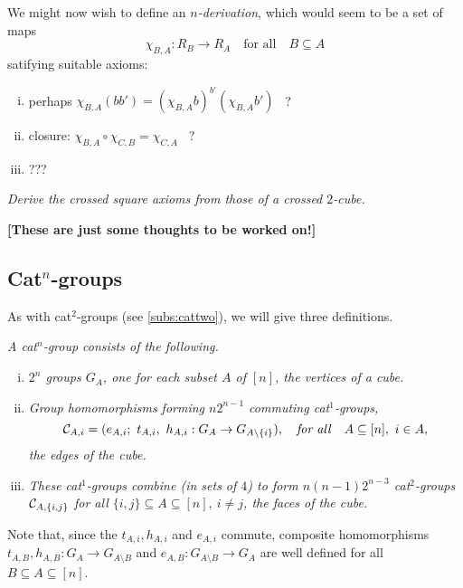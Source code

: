 \bigskip
We might now wish to define an \emph{$n$-derivation}, 
which would seem to be a set of maps
$$
\chi_{B,A} : R_B \to R_A  \quad\mbox{for all}\quad  B \subseteq A
$$
satifying suitable axioms:
\begin{enumerate}[(i)]
\item
perhaps  \qquad 
$\chi_{B,A}(bb') = (\chi_{B,A} b)^{b'} (\chi_{B,A} b')$ ~?
\item
closure: \qquad
$\chi_{B,A} \circ \chi_{C,B} = \chi_{C,A}$ ~?
\item ???
\end{enumerate}

\begin{exercise}
\emph{Derive the crossed square axioms 
from those of a crossed $2$-cube.}
\end{exercise}


\bigskip\noindent
{\bf [These are just some thoughts to be worked on!]}



\subsection{Cat$^n$-groups}   

As with cat$^2$-groups (see \ref{subs:cattwo}), 
we will give three definitions. 

\begin{defn} \label{def:catna}
\emph{A cat$^n$-group consists of the following.} 
\begin{enumerate}[(i)]
\item
\emph{$2^n$ groups  $G_A$, one for each subset  $A$  of  $[n]$, 
the \emph{vertices} of a cube.} 
\item
\emph{Group homomorphisms forming $n2^{n-1}$ commuting cat$^1$-groups,} 
$$
\mathcal{C}_{A,i} = (e_{A,i};\ t_{A,i},\ h_{A,i} : G_A \to G_{A \setminus \{i\}}), 
\quad\mbox{\emph{for all}} \quad A \subseteq [n],~ i \in A,  
$$
\emph{the \emph{edges} of the cube.} 
\item 
\emph{These cat$^1$-groups combine (in sets of $4$) 
to form $n(n-1)2^{n-3}$ cat$^2$-groups $\mathcal{C}_{A,\{i,j\}}$ 
for all $\{i,j\} \subseteq A \subseteq [n],~ i \neq j$, 
the \emph{faces} of the cube.} 
\end{enumerate}
\end{defn}
Note that, since the $t_{A,i}, h_{A,i}$ and $e_{A,i}$ commute, 
composite homomorphisms
$t_{A,B}, h_{A,B} : G_A \to G_{A \setminus B}$ and 
$e_{A,B} : G_{A \setminus B} \to G_A$ 
are well defined for all $B \subseteq A \subseteq [n]$.  

